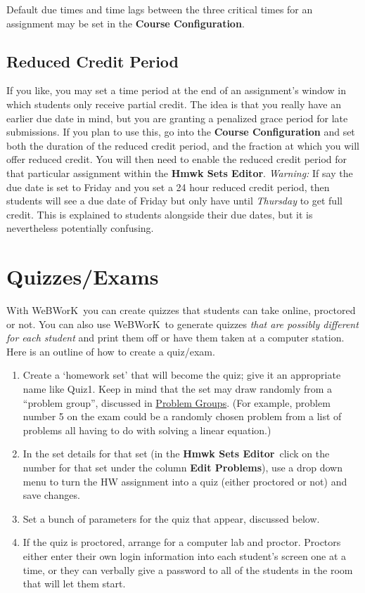 \documentclass[12pt]{article}
\newcommand{\menu}[1]{\textbf{#1}}
\newcommand{\WW}{WeBWorK}
\newcommand{\HSE}{\menu{Hmwk Sets Editor}}
\begin{document}
Default due times and time lags between the three critical times for an assignment may be set in the \menu{Course Configuration}.

\subsection{Reduced Credit Period}\label{reducedcredit}

If you like, you may set a time period at the end of an assignment's window in which students only receive partial credit.
The idea is that you really have an earlier due date in mind, but you are granting a penalized grace period for late submissions.
If you plan to use this, go into the \menu{Course Configuration} and set both the duration of the reduced credit period, and the fraction at which you will offer reduced credit.
You will then need to enable the reduced credit period for that particular assignment within the \HSE.
\emph{Warning:}
If say the due date is set to Friday and you set a 24 hour reduced credit period, then students will see a due date of Friday but only have until \emph{Thursday} to get full credit.
This is explained to students alongside their due dates, but it is nevertheless potentially confusing.

\section{Quizzes/Exams}

With \WW\ you can create quizzes that students can take online, proctored or not.
You can also use \WW\ to generate quizzes \emph{that are possibly different for each student} and print them off or have them taken at a computer station.
Here is an outline of how to create a quiz/exam.
\begin{enumerate}
	\item Create a `homework set' that will become the quiz; give it an appropriate name like Quiz1.
	      Keep in mind that the set may draw randomly from a ``problem group'', discussed in \hyperref[groups]{Problem Groups}.
	      (For example, problem number 5 on the exam could be a randomly chosen problem from a list of problems all having to do with solving a linear equation.)
	\item In the set details for that set (in the \HSE\ click on the number for that set under the column \menu{Edit Problems}), use a drop down menu to turn the HW assignment into a quiz (either proctored or not) and save changes.
	\item Set a bunch of parameters for the quiz that appear, discussed below.
	\item If the quiz is proctored, arrange for a computer lab and proctor.
	      Proctors either enter their own login information into each student's screen one at a time, or they can verbally give a password to all of the students in the room that will let them start.
\end{enumerate}
\end{document}
